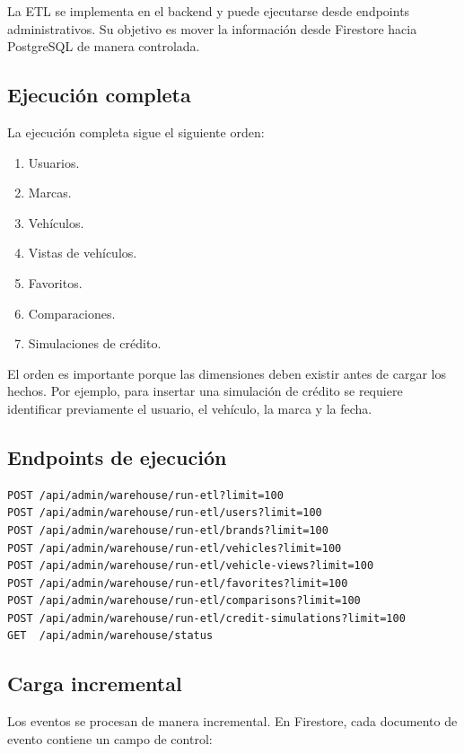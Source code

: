 \documentclass[12pt,letterpaper]{article}
\begin{document}
La ETL se implementa en el backend y puede ejecutarse desde endpoints administrativos. Su objetivo es mover la información desde Firestore hacia PostgreSQL de manera controlada.

\subsection{Ejecución completa}

La ejecución completa sigue el siguiente orden:

\begin{enumerate}
    \item Usuarios.
    \item Marcas.
    \item Vehículos.
    \item Vistas de vehículos.
    \item Favoritos.
    \item Comparaciones.
    \item Simulaciones de crédito.
\end{enumerate}

El orden es importante porque las dimensiones deben existir antes de cargar los hechos. Por ejemplo, para insertar una simulación de crédito se requiere identificar previamente el usuario, el vehículo, la marca y la fecha.

\subsection{Endpoints de ejecución}

\begin{lstlisting}[style=textstyle,caption={Endpoints de ETL}]
POST /api/admin/warehouse/run-etl?limit=100
POST /api/admin/warehouse/run-etl/users?limit=100
POST /api/admin/warehouse/run-etl/brands?limit=100
POST /api/admin/warehouse/run-etl/vehicles?limit=100
POST /api/admin/warehouse/run-etl/vehicle-views?limit=100
POST /api/admin/warehouse/run-etl/favorites?limit=100
POST /api/admin/warehouse/run-etl/comparisons?limit=100
POST /api/admin/warehouse/run-etl/credit-simulations?limit=100
GET  /api/admin/warehouse/status
\end{lstlisting}

\subsection{Carga incremental}

Los eventos se procesan de manera incremental. En Firestore, cada documento de evento contiene un campo de control:
\end{document}
